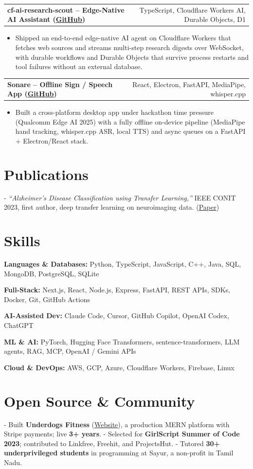 \documentclass[letterpaper,11pt]{article}
\makeatletter
\newcommand{\projItem}[2]{%
  \vspace{2pt}
  \begin{tabular*}{\textwidth}{@{}l@{\extracolsep{\fill}}r@{}}
    \textbf{#1} & #2 \\
  \end{tabular*}\par\vspace{-3pt}
}
\newcommand{\skillLine}[2]{\textbf{#1:} #2\par\vspace{1.5pt}}
\newcommand{\inlineBlock}[1]{{\setlength{\leftskip}{0.18in}\small #1\par}}
\makeatother
\begin{document}
\projItem{cf-ai-research-scout -- Edge-Native AI Assistant {\normalfont\small(\href{https://github.com/Deva-1903/cf_ai_research_scout}{GitHub})}}{TypeScript, Cloudflare Workers AI, Durable Objects, D1}
\begin{itemize}
  \item Shipped an end-to-end edge-native AI agent on Cloudflare Workers that fetches web sources and streams multi-step research digests over WebSocket, with durable workflows and Durable Objects that survive process restarts and tool failures without an external database.
\end{itemize}

\projItem{Sonare -- Offline Sign / Speech App {\normalfont\small(\href{https://github.com/Deva-1903/Qualcomm-Sep25-Team-Sonare}{GitHub})}}{React, Electron, FastAPI, MediaPipe, whisper.cpp}
\begin{itemize}
  \item Built a cross-platform desktop app under hackathon time pressure (Qualcomm Edge AI 2025) with a fully offline on-device pipeline (MediaPipe hand tracking, whisper.cpp ASR, local TTS) and async queues on a FastAPI + Electron/React stack.
\end{itemize}

\section{Publications}
\vspace{2pt}
\inlineBlock{- \textit{``Alzheimer's Disease Classification using Transfer Learning,''} IEEE CONIT 2023, first author, deep transfer learning on neuroimaging data. {\normalfont\small(\href{https://ieeexplore.ieee.org/document/10205760}{Paper})}}

\section{Skills}
\skillLine{Languages \& Databases}{Python, TypeScript, JavaScript, C++, Java, SQL, MongoDB, PostgreSQL, SQLite}
\skillLine{Full-Stack}{Next.js, React, Node.js, Express, FastAPI, REST APIs, SDKs, Docker, Git, GitHub Actions}
\skillLine{AI-Assisted Dev}{Claude Code, Cursor, GitHub Copilot, OpenAI Codex, ChatGPT}
\skillLine{ML \& AI}{PyTorch, Hugging Face Transformers, sentence-transformers, LLM agents, RAG, MCP, OpenAI / Gemini APIs}
\skillLine{Cloud \& DevOps}{AWS, GCP, Azure, Cloudflare Workers, Firebase, Linux}

\section{Open Source \& Community}
\inlineBlock{- Built \textbf{Underdogs Fitness} (\href{https://www.underdogsfitness.in/}{Website}), a production MERN platform with Stripe payments; live \textbf{3+ years}. - Selected for \textbf{GirlScript Summer of Code 2023}; contributed to Linkfree, Freehit, and ProjectsHut. - Tutored \textbf{30+ underprivileged students} in programming at Sayur, a non-profit in Tamil Nadu.}
\end{document}
